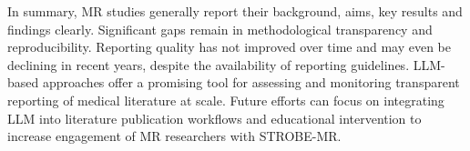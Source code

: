 


In summary, MR studies generally report their background, aims, key results and findings clearly. Significant gaps remain in methodological transparency and reproducibility. Reporting quality has not improved over time and may even be declining in recent years, despite the availability of reporting guidelines. LLM-based approaches offer a promising tool for assessing and monitoring transparent reporting of medical literature at scale. Future efforts can focus on integrating LLM into literature publication workflows and educational intervention to increase engagement of MR researchers with STROBE-MR. 